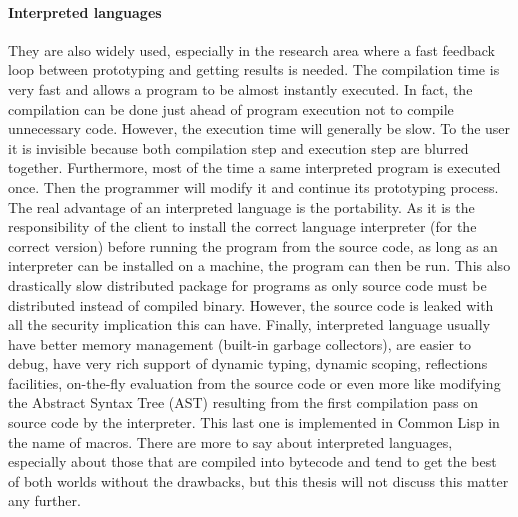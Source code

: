 \paragraph{Interpreted languages} They are also widely used, especially in the research area where a fast feedback loop
between prototyping and getting results is needed. The compilation time is very fast and allows a program to be almost
instantly executed. In fact, the compilation can be done just ahead of program execution not to compile unnecessary
code. However, the execution time will generally be slow. To the user it is invisible because both compilation step and
execution step are blurred together. Furthermore, most of the time a same interpreted program is executed once. Then the
programmer will modify it and continue its prototyping process. The real advantage of an interpreted language is the
portability. As it is the responsibility of the client to install the correct language interpreter (for the correct
version) before running the program from the source code, as long as an interpreter can be installed on a machine, the
program can then be run. This also drastically slow distributed package for programs as only source code must be
distributed instead of compiled binary. However, the source code is leaked with all the security implication this can
have. Finally, interpreted language usually have better memory management (built-in garbage collectors), are easier to
debug, have very rich support of dynamic typing, dynamic scoping, reflections facilities, on-the-fly evaluation from the
source code or even more like modifying the Abstract Syntax Tree (AST) resulting from the first compilation pass on
source code by the interpreter. This last one is implemented in Common Lisp in the name of macros. There are more to say
about interpreted languages, especially about those that are compiled into bytecode and tend to get the best of both
worlds without the drawbacks, but this thesis will not discuss this matter any further.

\bigskip


